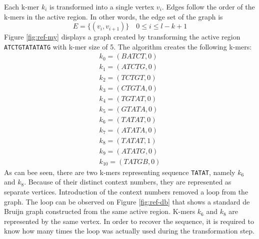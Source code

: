 Each k-mer $k_i$ is transformed into a single vertex $v_i$. Edges follow the order of the k-mers in the active region. In other words, the edge set of the graph is
$$
E = \{(v_i, v_{i+1})\}\quad 0 \leq i \leq l-k+1
$$
Figure \ref{fig:ref-my} displays a graph created by transforming the active region \texttt{ATCTGTATATATG} with k-mer size of 5. The algorithm creates the following k-mers:
\begin{align}
k_0 = (BATCT, 0) \\
k_1 = (ATCTG, 0) \\
k_2 = (TCTGT, 0) \\
k_3 = (CTGTA, 0) \\
k_4 = (TGTAT, 0) \\
k_5 = (GTATA, 0) \\
k_6 = (TATAT, 0) \\
k_7 = (ATATA, 0) \\
k_8 = (TATAT, 1) \\
k_9 = (ATATG, 0) \\
k_{10} = (TATGB, 0)
\end{align}
As can bee seen, there are two k-mers representing sequence \texttt{TATAT}, namely $k_6$ and $k_8$. Because of their distinct context numbers, they are represented as separate vertices. Introduction of the context numbers removed a loop from the graph. The loop can be observed on Figure \ref{fig:ref-db} that shows a standard de Bruijn graph constructed from the same active region. K-mers $k_6$ and $k_8$ are represented by the same vertex. In order to recover the sequence, it is required to know how many times the loop was actually used during the transformation step.


